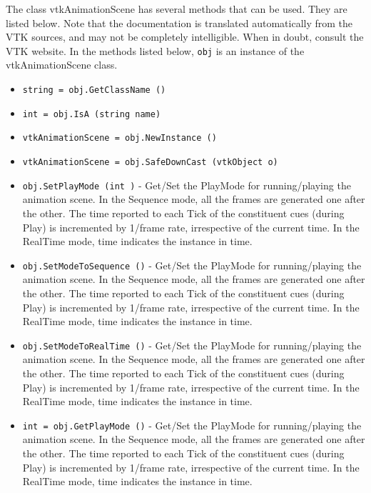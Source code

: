 The class vtkAnimationScene has several methods that can be used.
  They are listed below.
Note that the documentation is translated automatically from the VTK sources,
and may not be completely intelligible.  When in doubt, consult the VTK website.
In the methods listed below, \verb|obj| is an instance of the vtkAnimationScene class.
\begin{itemize}
\item  \verb|string = obj.GetClassName ()|

\item  \verb|int = obj.IsA (string name)|

\item  \verb|vtkAnimationScene = obj.NewInstance ()|

\item  \verb|vtkAnimationScene = obj.SafeDownCast (vtkObject o)|

\item  \verb|obj.SetPlayMode (int )| -  Get/Set the PlayMode for running/playing the animation scene.
 In the Sequence mode, all the frames are generated one after the other.
 The time reported to each Tick of the constituent cues (during Play) is
 incremented by 1/frame rate, irrespective of the current time.
 In the RealTime mode, time indicates the instance in time. 

\item  \verb|obj.SetModeToSequence ()| -  Get/Set the PlayMode for running/playing the animation scene.
 In the Sequence mode, all the frames are generated one after the other.
 The time reported to each Tick of the constituent cues (during Play) is
 incremented by 1/frame rate, irrespective of the current time.
 In the RealTime mode, time indicates the instance in time. 

\item  \verb|obj.SetModeToRealTime ()| -  Get/Set the PlayMode for running/playing the animation scene.
 In the Sequence mode, all the frames are generated one after the other.
 The time reported to each Tick of the constituent cues (during Play) is
 incremented by 1/frame rate, irrespective of the current time.
 In the RealTime mode, time indicates the instance in time. 

\item  \verb|int = obj.GetPlayMode ()| -  Get/Set the PlayMode for running/playing the animation scene.
 In the Sequence mode, all the frames are generated one after the other.
 The time reported to each Tick of the constituent cues (during Play) is
 incremented by 1/frame rate, irrespective of the current time.
 In the RealTime mode, time indicates the instance in time. 


\end{itemize}
